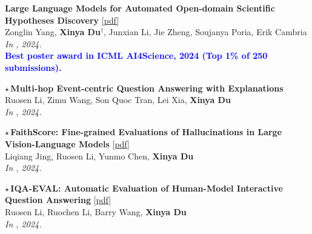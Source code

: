 \begin{enumerate}[{[}1{]},resume,leftmargin=*]
\parbox{\linewidth}{
\item\label{pub:hypo}
 
{\bf Large Language Models for Automated Open-domain Scientific Hypotheses Discovery} 
\href{https://aclanthology.org/2024.findings-acl.804.pdf}{{[pdf]}} \\
Zonglin Yang, \textbf{Xinya Du}$^{\dagger}$, Junxian Li, Jie Zheng, Soujanya Poria, Erik Cambria \\
{\it In \ACLfinding, 2024.} \\
% 
{\textcolor{blue}{\textbf{Best poster award in ICML AI4Science, 2024 (Top 1\% of 250 submissions).}}} \\
}

\parbox{\linewidth}{
\item\label{pub:meqa}
$\star$\,{\bf Multi-hop Event-centric Question Answering with Explanations} \\
Ruosen Li, Zimu Wang, Son Quoc Tran, Lei Xia, \textbf{Xinya Du}  \\
{\it In \Neurips, 2024.} \\

}

\parbox{\linewidth}{
\item\label{pub:faithscore}
$\star$\,{\bf FaithScore: Fine-grained Evaluations of Hallucinations in Large Vision-Language Models} 
\href{https://arxiv.org/pdf/2311.01477}{{[pdf]}} \\
Liqiang Jing, Ruosen Li, Yunmo Chen, \textbf{Xinya Du}  \\
{\it In \EMNLPfinding, 2024.} \\
}

\parbox{\linewidth}{
\item\label{pub:iqaeval}
$\star$\,{\bf IQA-EVAL: Automatic Evaluation of Human-Model Interactive Question Answering}  
\href{https://arxiv.org/pdf/2408.13545}{{[pdf]}} \\
Ruosen Li, Ruochen Li, Barry Wang, \textbf{Xinya Du} \\
{\it In \Neurips, 2024.} \\
}


\end{enumerate}
